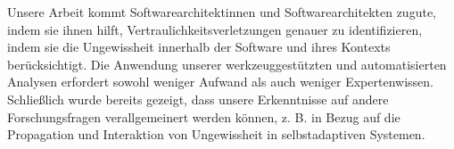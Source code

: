 {Unsere Arbeit kommt Softwarearchitektinnen und Softwarearchitekten zugute, indem sie ihnen hilft, Vertraulichkeitsverletzungen genauer zu identifizieren, indem sie die Ungewissheit innerhalb der Software und ihres Kontexts berücksichtigt.
Die Anwendung unserer werkzeuggestützten und automatisierten Analysen erfordert sowohl weniger Aufwand als auch weniger Expertenwissen.
Schließlich wurde bereits gezeigt, dass unsere Erkenntnisse auf andere Forschungsfragen verallgemeinert werden können, z. B. in Bezug auf die Propagation und Interaktion von Ungewissheit in selbstadaptiven Systemen.
%
}